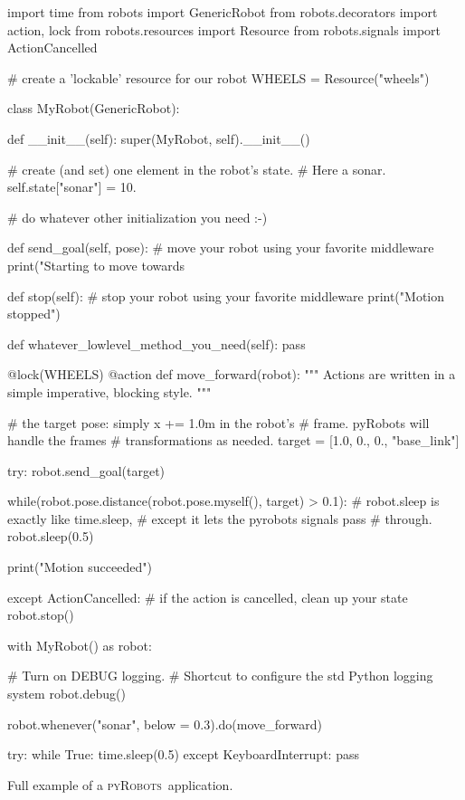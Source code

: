 \documentclass[a4paper, 10pt, conference]{ieeeconf}      %
\newcommand{\pyRobots}{\textsc{pyRobots}\ }
\begin{document}
\begin{listing}[h!]

\begin{pythoncode}
    import time
    from robots import GenericRobot
    from robots.decorators import action, lock
    from robots.resources import Resource
    from robots.signals import ActionCancelled

    # create a 'lockable' resource for our robot
    WHEELS = Resource("wheels")

    class MyRobot(GenericRobot):

      def __init__(self):
        super(MyRobot, self).__init__()

        # create (and set) one element in the robot's state.
        # Here a sonar.
        self.state["sonar"] = 10.

        # do whatever other initialization you need :-)

      def send_goal(self, pose):
        # move your robot using your favorite middleware
        print("Starting to move towards %

      def stop(self):
        # stop your robot using your favorite middleware
        print("Motion stopped")

      def whatever_lowlevel_method_you_need(self):
        pass

    @lock(WHEELS)
    @action
    def move_forward(robot):
      """ Actions are written in a simple imperative, 
          blocking style.
      """

      # the target pose: simply x += 1.0m in the robot's 
      # frame. pyRobots will handle the frames 
      # transformations as needed.
      target = [1.0, 0., 0., "base_link"]

      try:
        robot.send_goal(target)

        while(robot.pose.distance(robot.pose.myself(), 
                                  target) > 0.1):
            # robot.sleep is exactly like time.sleep, 
            # except it lets the pyrobots signals pass 
            # through.
            robot.sleep(0.5)

        print("Motion succeeded")

      except ActionCancelled:
        # if the action is cancelled, clean up your state
        robot.stop()


    with MyRobot() as robot:

      # Turn on DEBUG logging.
      # Shortcut to configure the std Python logging system
      robot.debug()

      robot.whenever("sonar", below = 0.3).do(move_forward)

      try:
        while True:
          time.sleep(0.5)
      except KeyboardInterrupt:
        pass
\end{pythoncode}
\caption{Full example of a \pyRobots application.}
\label{mwe}
\end{listing}
\end{document}
